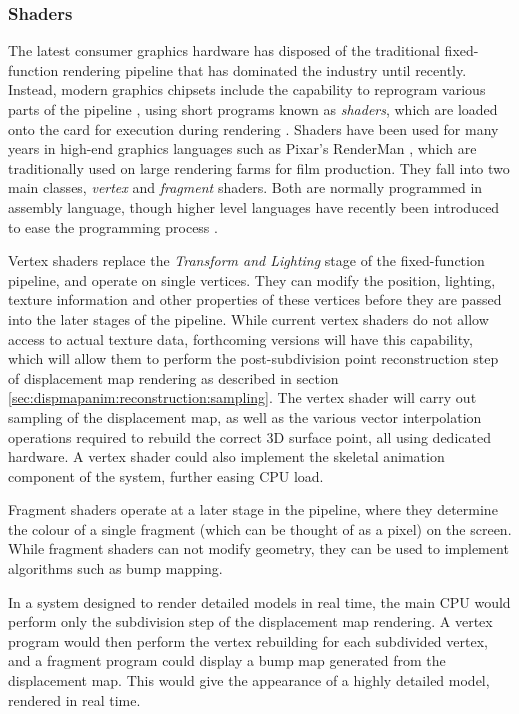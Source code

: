 \subsubsection{\label{sec:conclusion:future:realtime:shaders}Shaders}

The latest consumer graphics hardware has disposed of the traditional fixed-function rendering pipeline that has dominated the industry until recently. Instead, modern graphics chipsets include the capability to reprogram various parts of the pipeline \cite{Lindholm01}, using short programs known as {\it shaders}, which are loaded onto the card for execution during rendering \cite{Proudfoot01}. Shaders have been used for many years in high-end graphics languages such as Pixar's RenderMan \cite{Apodaca99}, which are traditionally used on large rendering farms for film production. They fall into two main classes, {\it vertex} and {\it fragment} shaders. Both are normally programmed in assembly language, though higher level languages have recently been introduced to ease the programming process \cite{Mark03}.

Vertex shaders replace the {\it Transform and Lighting} stage of the fixed-function pipeline, and operate on single vertices. They can modify the position, lighting, texture information and other properties of these vertices before they are passed into the later stages of the pipeline. While current vertex shaders do not allow access to actual texture data, forthcoming versions will have this capability, which will allow them to perform the post-subdivision point reconstruction step of displacement map rendering as described in section \ref{sec:dispmapanim:reconstruction:sampling}. The vertex shader will carry out sampling of the displacement map, as well as the various vector interpolation operations required to rebuild the correct 3D surface point, all using dedicated hardware. A vertex shader could also implement the skeletal animation component of the system, further easing CPU load.

Fragment shaders operate at a later stage in the pipeline, where they determine the colour of a single fragment (which can be thought of as a pixel) on the screen. While fragment shaders can not modify geometry, they can be used to implement algorithms such as bump mapping. 

In a system designed to render detailed models in real time, the main CPU would perform only the subdivision step of the displacement map rendering. A vertex program would then perform the vertex rebuilding for each subdivided vertex, and a fragment program could display a bump map generated from the displacement map. This would give the appearance of a highly detailed model, rendered in real time.

